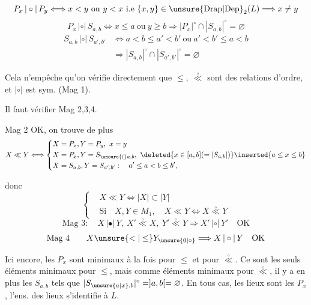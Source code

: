 \[
 P_x\,|\circ|\,P_y\Longleftrightarrow x<y\ \text{ou}\ y<x\ \text{i.e}\ 
 \{x,y\}\in\unsure{\mathrm{Drap}|\mathrm{Dep}}_2(L)\Longrightarrow x\ne y
\]
\[
 P_x\,|\circ|\,S_{a,b}\Longleftrightarrow x\leq a\ \text{ou}\ y\geq b
 \Longrightarrow |P_x|^\circ\cap|S_{a,b}|^\circ=\varnothing
\]
\[
\begin{aligned}
 S_{a,b}\,|\circ|\,S_{a',b'}&\Longleftrightarrow
 a<b\leq a'<b'\ \text{ou}\ a'<b'\leq a<b\\
 &\Longrightarrow |S_{a,b}|^\circ\cap|S_{a',b'}|^\circ=\varnothing
\end{aligned}
\]

Cela n'empêche qu'on vérifie directement que \deleted{$\unsure{\notin|\nleq}$} $\leq,\ \overset{\circ}{\ll}$ sont des relations d'ordre, et $|\circ|$ est sym.  (Mag 1).

Il faut vérifier Mag 2,3,4.

Mag 2 OK, on trouve de plus
\[
 X\ll Y\Longleftrightarrow\left\{\begin{aligned}
 &X=P_x,Y=P_y,\ x=y\\
 &X=P_x,Y=S_{\unsure{(}a,b},\ 
    \deleted{x\in[a,b](=|S_{a,b}|)}\inserted{a\leq x\leq b}\\
 &X=S_{a,b},Y=S_{a',b'}:\quad a'\leq a<b\leq b',
 \end{aligned}\right.
\]

donc
\[
 \left\{\begin{aligned}
 &X\ll Y\Longleftrightarrow |X|\subset|Y|\\
 &\text{Si}\quad X,Y\in M_1,\quad X\ll Y\Longleftrightarrow X\overset{\circ}{\ll}Y
 \end{aligned}\right.
\]
\[
 \text{Mag }3:\quad X\,|\bullet|\,Y,\ X'\overset{\circ}{\ll}X,\ 
 Y'\overset{\circ}{\ll}Y\Longrightarrow X'\,|\circ|\,Y'\quad\text{OK}
\]
\[
 \text{Mag }4\qquad X\unsure{<|\leq}Y_{\unsure{0|\circ}}\Longrightarrow X\,|\circ|\,Y\quad\text{OK}
\]

Ici encore, les $P_x$ sont \deleted{\unsure{les él}} minimaux à la fois pour $\leq$ et pour $\overset{\circ}{\ll}$. Ce sont les seuls éléments minimaux pour $\leq$,  mais comme éléments minimaux pour $\overset{\circ}{\ll}$, il y a en plus les $S_{a,b}$ tels que $|S_{\unsure{a|x},b}|^\circ=]a,b[=\varnothing$. En tous cas, les lieux sont les $P_x$, l'ens. des lieux s'identifie à $L$.

